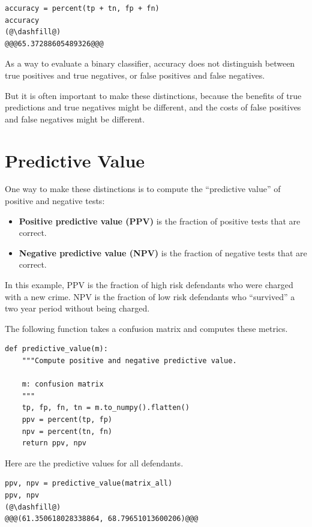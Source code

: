 \begin{lstlisting}[]
accuracy = percent(tp + tn, fp + fn)
accuracy
(@\dashfill@)
@@@65.37288605489326@@@
\end{lstlisting}

As a way to evaluate a binary classifier, accuracy does not distinguish
between true positives and true negatives, or false positives and false
negatives.

But it is often important to make these distinctions, because the
benefits of true predictions and true negatives might be different, and
the costs of false positives and false negatives might be different.

\hypertarget{predictive-value}{%
\section{Predictive Value}\label{predictive-value}}

One way to make these distinctions is to compute the ``predictive
value'' of positive and negative tests:

\begin{itemize}
\item
  \textbf{Positive predictive value (PPV)} is the fraction of positive
  tests that are correct.
\item
  \textbf{Negative predictive value (NPV)} is the fraction of negative
  tests that are correct.
\end{itemize}

In this example, PPV is the fraction of high risk defendants who were
charged with a new crime. NPV is the fraction of low risk defendants who
``survived'' a two year period without being charged.

The following function takes a confusion matrix and computes these
metrics.

\begin{lstlisting}[]
def predictive_value(m):
    """Compute positive and negative predictive value.
    
    m: confusion matrix
    """
    tp, fp, fn, tn = m.to_numpy().flatten()
    ppv = percent(tp, fp)
    npv = percent(tn, fn)
    return ppv, npv
\end{lstlisting}

Here are the predictive values for all defendants.

\begin{lstlisting}[]
ppv, npv = predictive_value(matrix_all)
ppv, npv
(@\dashfill@)
@@@(61.350618028338864, 68.79651013600206)@@@
\end{lstlisting}

